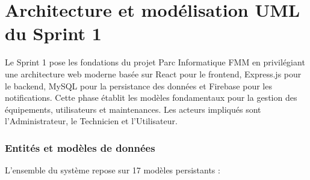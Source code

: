 \section{Architecture et modélisation UML du Sprint 1}
\label{sec:uml_sprint1}

Le Sprint 1 pose les fondations du projet Parc Informatique FMM en privilégiant une architecture web moderne basée sur React pour le frontend, Express.js pour le backend, MySQL pour la persistance des données et Firebase pour les notifications. Cette phase établit les modèles fondamentaux pour la gestion des équipements, utilisateurs et maintenances. Les acteurs impliqués sont l'Administrateur, le Technicien et l'Utilisateur.

\subsubsection{Entités et modèles de données}

L'ensemble du système repose sur 17 modèles persistants :

